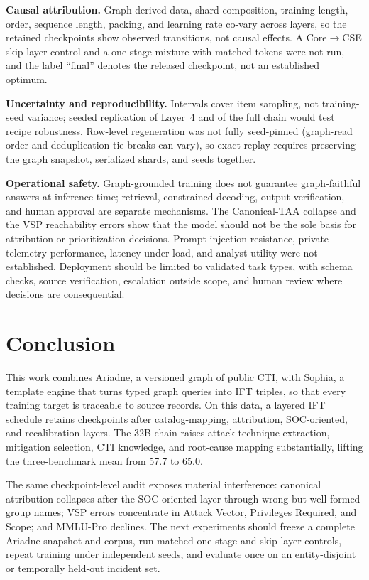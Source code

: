 \documentclass[conference]{IEEEtran}
\begin{document}
\textbf{Causal attribution.} Graph-derived data, shard composition, training length, order, sequence length, packing, and learning rate co-vary across layers, so the retained checkpoints show observed transitions, not causal effects. A Core$\rightarrow$CSE skip-layer control and a one-stage mixture with matched tokens were not run, and the label ``final'' denotes the released checkpoint, not an established optimum.

\textbf{Uncertainty and reproducibility.} Intervals cover item sampling, not training-seed variance; seeded replication of Layer~4 and of the full chain would test recipe robustness. Row-level regeneration was not fully seed-pinned (graph-read order and deduplication tie-breaks can vary), so exact replay requires preserving the graph snapshot, serialized shards, and seeds together.

\textbf{Operational safety.} Graph-grounded training does not guarantee graph-faithful answers at inference time; retrieval, constrained decoding, output verification, and human approval are separate mechanisms. The Canonical-TAA collapse and the VSP reachability errors show that the model should not be the sole basis for attribution or prioritization decisions. Prompt-injection resistance, private-telemetry performance, latency under load, and analyst utility were not established. Deployment should be limited to validated task types, with schema checks, source verification, escalation outside scope, and human review where decisions are consequential.

\section{Conclusion}
This work combines Ariadne, a versioned graph of public CTI, with Sophia, a template engine that turns typed graph queries into IFT triples, so that every training target is traceable to source records. On this data, a layered IFT schedule retains checkpoints after catalog-mapping, attribution, SOC-oriented, and recalibration layers. The 32B chain raises attack-technique extraction, mitigation selection, CTI knowledge, and root-cause mapping substantially, lifting the three-benchmark mean from 57.7 to 65.0.

The same checkpoint-level audit exposes material interference: canonical attribution collapses after the SOC-oriented layer through wrong but well-formed group names; VSP errors concentrate in Attack Vector, Privileges Required, and Scope; and MMLU-Pro declines. The next experiments should freeze a complete Ariadne snapshot and corpus, run matched one-stage and skip-layer controls, repeat training under independent seeds, and evaluate once on an entity-disjoint or temporally held-out incident set.



\end{document}
